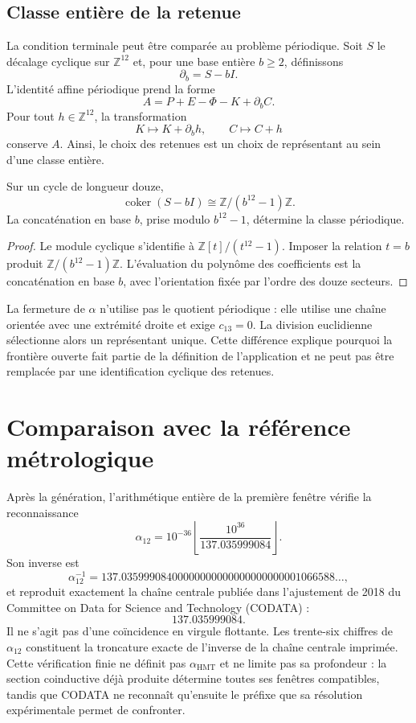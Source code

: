 \subsection{Classe entière de la retenue}

La condition terminale peut être comparée au problème périodique. Soit
\(S\) le décalage cyclique sur \(\mathbb Z^{12}\) et, pour une base
entière \(b\geq2\), définissons
\[
 \partial_b=S-bI.
\]
L'identité affine périodique prend la forme
\[
 A=P+E-\Phi-K+\partial_bC.
\]
Pour tout \(h\in\mathbb Z^{12}\), la transformation
\[
 K\longmapsto K+\partial_bh,
 \qquad
 C\longmapsto C+h
\]
conserve \(A\). Ainsi, le choix des retenues est un choix de
représentant au sein d'une classe entière.

\begin{proposition}
\label{prop:cociente-periodico-acarreo}
Sur un cycle de longueur douze,
\[
 \operatorname{coker}(S-bI)\cong
 \mathbb Z/(b^{12}-1)\mathbb Z.
\]
La concaténation en base \(b\), prise modulo \(b^{12}-1\), détermine la
classe périodique.
\end{proposition}

\begin{proof}
Le module cyclique s'identifie à
\(\mathbb Z[t]/(t^{12}-1)\). Imposer la relation \(t=b\) produit
\(\mathbb Z/(b^{12}-1)\mathbb Z\). L'évaluation du polynôme des
coefficients est la concaténation en base \(b\), avec l'orientation fixée
par l'ordre des douze secteurs.
\end{proof}

La fermeture de \(\alpha\) n'utilise pas le quotient périodique : elle utilise une chaîne
orientée avec une extrémité droite et exige \(c_{13}=0\). La division euclidienne
sélectionne alors un représentant unique. Cette différence explique
pourquoi la frontière ouverte fait partie de la définition de l'application et ne
peut pas être remplacée par une identification cyclique des retenues.

\section{Comparaison avec la référence métrologique}

Après la génération, l'arithmétique entière de la première fenêtre
vérifie la reconnaissance
\[
\boxed{
\alpha_{12}
=10^{-36}
\left\lfloor\frac{10^{36}}{137.035999084}\right\rfloor.}
\]
Son inverse est
\[
\alpha_{12}^{-1}
=137.03599908400000000000000000000001066588\ldots,
\]
et reproduit exactement la chaîne centrale publiée dans l'ajustement de 2018 du
Committee on Data for Science and Technology (CODATA) \cite{Tiesinga2021CODATA} :
\[
\boxed{137.035999084.}
\]
Il ne s'agit pas d'une coïncidence en virgule flottante. Les trente-six chiffres de
\(\alpha_{12}\) constituent la troncature exacte de l'inverse de la
chaîne centrale imprimée. Cette vérification finie ne définit pas
\(\alpha_{\mathrm{HMT}}\) et ne limite pas sa profondeur : la section coinductive
déjà produite détermine toutes ses fenêtres compatibles, tandis que CODATA ne
reconnaît qu'ensuite le préfixe que sa résolution expérimentale permet
de confronter.

